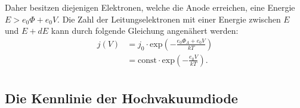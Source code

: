 \noindent
Daher besitzen diejenigen Elektronen, welche die Anode erreichen, eine Energie
$E > e_0 \Phi + e_0 V$. Die Zahl der Leitungselektronen mit einer Energie zwischen
$E$ und $E + dE$ kann durch folgende Gleichung angenähert werden:
\begin{align}
  j(V) & = j_0 \cdot \text{exp}\left(-\frac{e_0 \Phi_A + e_0 V}{kT}\right) \\
       & = \text{const} \cdot  \text{exp}\left(-\frac{e_0 V}{kT}\right).     \\
  \label{eqn:anlaufstrom}
\end{align}

\subsection{Die Kennlinie der Hochvakuumdiode}
